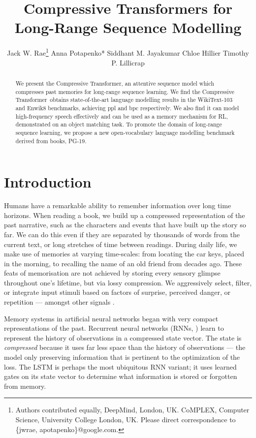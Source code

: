 \documentclass{article} \usepackage{iclr2020_conference,times}
\title{Compressive Transformers for Long-Range Sequence Modelling}
\author{
\centering
Jack W. Rae\thanks{
Authors contributed equally,
 DeepMind, London, UK.
 CoMPLEX, Computer Science, University College London, UK.
Please direct correspondence to \{jwrae, apotapenko\}@google.com.
}
\And
Anna Potapenko*
\And
Siddhant M. Jayakumar
\And
Chloe Hillier
\And
Timothy P. Lillicrap
}
\newcommand{\model}{Compressive Transformer}
\newcommand{\dataset}{PG-19}
\begin{document}
\maketitle


\begin{abstract}
We present the \model, an attentive sequence model which compresses past memories for long-range sequence learning. We find the \model~obtains state-of-the-art language modelling results in the WikiText-103 and Enwik8 benchmarks, achieving  ppl and  bpc respectively. We also find it can model high-frequency speech effectively and can be used as a memory mechanism for RL, demonstrated on an object matching task. To promote the domain of long-range sequence learning, we propose a new open-vocabulary language modelling benchmark derived from books, \dataset.
\end{abstract}
\section{Introduction}
Humans have a remarkable ability to remember information over long time horizons. When reading a book, we build up a compressed representation of the past narrative, such as the characters and events that have built up the story so far. We can do this even if they are separated by thousands of words from the current text, or long stretches of time between readings. During daily life, we make use of memories at varying time-scales: from locating the car keys, placed in the morning, to recalling the name of an old friend from decades ago. These feats of memorisation are not achieved by storing every sensory glimpse throughout one's lifetime, but via lossy compression. We aggressively select, filter, or integrate input stimuli based on factors of surprise, perceived danger, or repetition --- amongst other signals \citep{richards2017persistence}.

Memory systems in artificial neural networks began with very compact representations of the past. Recurrent neural networks (RNNs, \citet{rumelhart1986learning}) learn to represent the history of observations in a compressed state vector. The state is \textit{compressed} because it uses far less space than the history of observations --- the model only preserving information that is pertinent to the optimization of the loss. The LSTM \citep{hochreiter1997long} is perhaps the most ubiquitous RNN variant; it uses learned gates on its state vector to determine what information is stored or forgotten from memory. 
\end{document}
